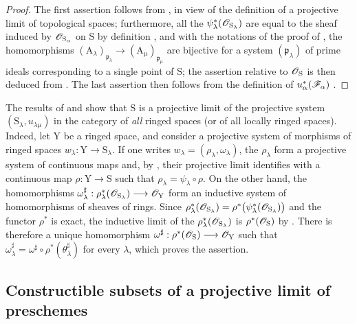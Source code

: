 \begin{proof}
The first assertion follows from , in view of the definition of a projective limit of topological spaces; furthermore, all the $\psi_\lambda^*(\mathscr{O}_{\mathrm{S}_\lambda})$ are equal to the sheaf induced by $\mathscr{O}_{\mathrm{S}_\alpha}$ on $\mathrm{S}$ by definition , and with the notations of the proof of , the homomorphisms $(\mathrm{A}_\lambda)_{\mathfrak{p}_\lambda}\to(\mathrm{A}_\mu)_{\mathfrak{p}_\mu}$ are bijective for a system $(\mathfrak{p}_\lambda)$ of prime ideals corresponding to a single point of $\mathrm{S}$; the assertion relative to $\mathscr{O}_\mathrm{S}$ is then deduced from .
The last assertion then follows from the definition of $u_\alpha^*(\mathscr{F}_\alpha)$ .
\end{proof}

\begin{remark}[8.2.14]
\label{IV.8.2.14}
The results of  and  show that $\mathrm{S}$ is a projective limit of the projective system $(\mathrm{S}_\lambda,u_{\lambda\mu})$ in the category of \emph{all} ringed spaces (or of all locally ringed spaces).
Indeed, let $\mathrm{Y}$ be a ringed space, and consider a projective system of morphisms of ringed spaces $w_\lambda:\mathrm{Y}\to\mathrm{S}_\lambda$.
If one writes $w_\lambda=(\rho_\lambda,\omega_\lambda)$, the $\rho_\lambda$ form a projective system of continuous maps and, by , their projective limit identifies with a continuous map $\rho:\mathrm{Y}\to\mathrm{S}$ such that $\rho_\lambda=\psi_\lambda\circ\rho$. On the other hand, the homomorphisms $\omega_\lambda^\sharp:\rho_\lambda^*(\mathscr{O}_{\mathrm{S}_\lambda})\longrightarrow\mathscr{O}_\mathrm{Y}$
form an inductive system of homomorphisms of sheaves of rings. Since $\rho_\lambda^*(\mathscr{O}_{\mathrm{S}_\lambda})
=\rho^*\bigl(\psi_\lambda^*(\mathscr{O}_{\mathrm{S}_\lambda})\bigr)$
and the functor $\rho^*$ is exact, the inductive limit of the $\rho_\lambda^*(\mathscr{O}_{\mathrm{S}_\lambda})$ is $\rho^*(\mathscr{O}_\mathrm{S})$ by . There is therefore a unique homomorphism $\omega^\sharp:\rho^*(\mathscr{O}_\mathrm{S})\longrightarrow\mathscr{O}_\mathrm{Y}$
such that $\omega_\lambda^\sharp=\omega^\sharp\circ\rho^*(\theta_\lambda^\sharp)$ for every $\lambda$, which proves the assertion.
\end{remark}

\subsection{Constructible subsets of a projective limit of preschemes}
\label{subsection:IV.8.3}

